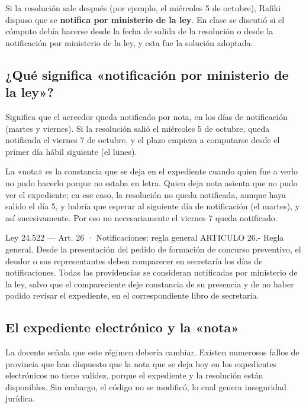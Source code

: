 \documentclass[12pt,oneside]{book}
\begin{document}
Si la resolución sale después (por ejemplo, el miércoles 5 de octubre), Rafiki dispuso que se \textbf{notifica por ministerio de la ley}. En clase se discutió si el cómputo debía hacerse desde la fecha de salida de la resolución o desde la notificación por ministerio de la ley, y esta fue la solución adoptada.

\subsection{¿Qué significa «notificación por ministerio de la ley»?}

Significa que el acreedor queda notificado por nota, en los días de notificación (martes y viernes). Si la resolución salió el miércoles 5 de octubre, queda notificada el viernes 7 de octubre, y el plazo empieza a computarse desde el primer día hábil siguiente (el lunes).

La «nota» es la constancia que se deja en el expediente cuando quien fue a verlo no pudo hacerlo porque no estaba en letra. Quien deja nota asienta que no pudo ver el expediente; en ese caso, la resolución no queda notificada, aunque haya salido el día 5, y habría que esperar al siguiente día de notificación (el martes), y así sucesivamente. Por eso no necesariamente el viernes 7 queda notificado.

\begin{legal}{Ley 24.522 — Art. 26 · Notificaciones: regla general}
ARTICULO 26.- Regla general. Desde la presentación del pedido de formación de concurso preventivo, el deudor o sus representantes deben comparecer en secretaría los días de notificaciones. Todas las providencias se consideran notificadas por ministerio de la ley, salvo que el compareciente deje constancia de su presencia y de no haber podido revisar el expediente, en el correspondiente libro de secretaria.
\end{legal}

\subsection{El expediente electrónico y la «nota»}

La docente señala que este régimen debería cambiar. Existen numerosos fallos de provincia que han dispuesto que la nota que se deja hoy en los expedientes electrónicos no tiene validez, porque el expediente y la resolución están disponibles. Sin embargo, el código no se modificó, lo cual genera inseguridad jurídica.
\end{document}
